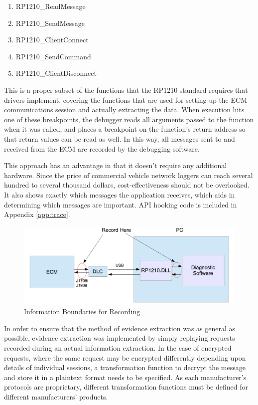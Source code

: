 \begin{enumerate}
  \item RP1210\_ReadMessage
  \item RP1210\_SendMessage
  \item RP1210\_ClientConnect
  \item RP1210\_SendCommand
  \item RP1210\_ClientDisconnect
\end{enumerate}

This is a proper subset of the functions that the RP1210 standard requires that drivers implement, covering the functions that
are used for setting up the ECM communications session and actually extracting the data.
When execution hits one of these breakpoints, the debugger reads all arguments passed to the function when it was called,
and places a breakpoint on the function's return address so that return values can be read as well. In this way, all
messages sent to and received from the ECM are recorded by the debugging software.

This approach has an advantage in that it doesn't require any additional hardware. Since the price of 
commercial vehicle network loggers can reach several hundred to several thousand dollars, cost-effectiveness should
not be overlooked. It also shows exactly which messages the application receives, which aids in determining which
messages are important. API hooking code is included in Appendix \ref{app:trace}.

\begin{figure}[h]
  \centering
  \includegraphics[scale=0.5]{RecordPoint}
  \caption{Information Boundaries for Recording}
  \label{fig:infoboundaries}
\end{figure}


In order to ensure that the method of evidence extraction was as general as possible, evidence extraction was implemented
by simply replaying requests recorded during an actual information extraction. In the case of encrypted requests, where
the same request may be encrypted differently depending upon details of individual sessions, a transformation function
to decrypt the message and store it in a plaintext format needs to be specified. As each manufacturer's protocols
are proprietary, different transformation functions must be defined for different manufacturers' products.

